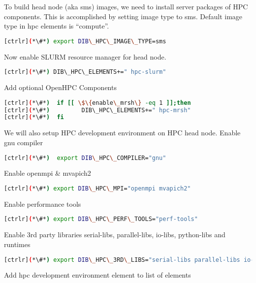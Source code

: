 To build head node (aka sms) images, we need to install server packages of HPC components. This is accomplished by setting image type to sms. Default image type in hpc elements is “compute”.

\begin{lstlisting}[language=bash,keywords={}]
[ctrlr](*\#*) export DIB\_HPC\_IMAGE\_TYPE=sms
\end{lstlisting}

Now enable SLURM resource manager for head node.

\begin{lstlisting}[language=bash,keywords={}]
[ctrlr](*\#*) DIB\_HPC\_ELEMENTS+=" hpc-slurm"
\end{lstlisting}

Add optional OpenHPC Components

\begin{lstlisting}[language=bash,keywords={}]
[ctrlr](*\#*)  if [[ \$\{enable\_mrsh\} -eq 1 ]];then
[ctrlr](*\#*)         DIB\_HPC\_ELEMENTS+=" hpc-mrsh"
[ctrlr](*\#*)  fi
\end{lstlisting}

We will also setup HPC development environment on HPC head node. 
Enable gnu compiler

\begin{lstlisting}[language=bash,keywords={}]
[ctrlr](*\#*)  export DIB\_HPC\_COMPILER="gnu"
\end{lstlisting}

Enable openmpi \& mvapich2

\begin{lstlisting}[language=bash,keywords={}]
[ctrlr](*\#*) export DIB\_HPC\_MPI="openmpi mvapich2"
\end{lstlisting}

Enable performance tools

\begin{lstlisting}[language=bash,keywords={}]
[ctrlr](*\#*) export DIB\_HPC\_PERF\_TOOLS="perf-tools"
\end{lstlisting}

Enable 3rd party libraries serial-libs, parallel-libs, io-libs, python-libs and runtimes

\begin{lstlisting}[language=bash,keywords={}]
[ctrlr](*\#*) export DIB\_HPC\_3RD\_LIBS="serial-libs parallel-libs io-libs python-libs runtimes"
\end{lstlisting}

Add hpc development environment element to list of elements

